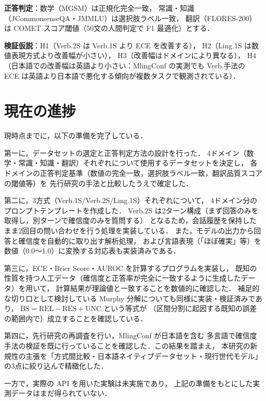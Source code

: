\documentclass[10pt,a4paper,twocolumn]{article}
\begin{document}
\textbf{正答判定}：数学（MGSM）は正規化完全一致，
常識・知識（JCommonsenseQA・JMMLU）は選択肢ラベル一致，
翻訳（FLORES-200）は COMET スコア閾値（50文の人間判定で F1 最適化）とする．

\textbf{検証仮説}：H1（Verb.2S は Verb.1S より ECE を改善する），
H2（Ling.1S は数値表現方式より改善幅が小さい），
H3（改善幅はドメインにより異なる），
H4（日本語での改善幅は英語より小さい：MlingConf の実測でも
Verb.手法の ECE は英語より日本語で悪化する傾向が複数タスクで観測されている）．

\section{現在の進捗}

現時点までに，以下の準備を完了している．

第一に，データセットの選定と正答判定方法の設計を行った．
4ドメイン（数学・常識・知識・翻訳）それぞれについて使用するデータセットを決定し，
各ドメインの正答判定基準（数値の完全一致，選択肢ラベル一致，翻訳品質スコアの閾値等）を
先行研究の手法と比較したうえで確定した．

第二に，3方式（Verb.1S/Verb.2S/Ling.1S）それぞれについて，
4ドメイン分のプロンプトテンプレートを作成した．
Verb.2S は2ターン構成（まず回答のみを取得し，別ターンで確信度のみを質問する）
となるため，会話履歴を保持したまま2回目の問い合わせを行う処理を実装している．
また，モデルの出力から回答と確信度を自動的に取り出す解析処理，
および言語表現（「ほぼ確実」等）を数値（0.0〜1.0）に変換する対応表も実装済みである．

第三に，ECE・Brier Score・AUROC を計算するプログラムを実装し，
既知の性質を持つ人工データ（確信度と正答率が完全に一致するように生成したデータ）を用いて，
計算結果が理論値と一致することを数値的に確認した．
補足的な切り口として検討している Murphy 分解についても同様に実装・検証済みであり，
$\text{BS} = \text{REL} - \text{RES} + \text{UNC}$ という等式が
（区間分割に起因する既知の誤差の範囲内で）成立することを確認している．

第四に，先行研究の再調査を行い，MlingConf\cite{xue2025mlingconf} が日本語を含む
多言語で確信度手法の検証を既に行っていることを確認した．この結果を踏まえ，
本研究の新規性の主張を「方式間比較・日本語ネイティブデータセット・現行世代モデル」
の3点に絞り込んで精緻化した．

一方で，実際の API を用いた実験は未実施であり，
上記の準備をもとにした実測データはまだ得られていない．
\end{document}
